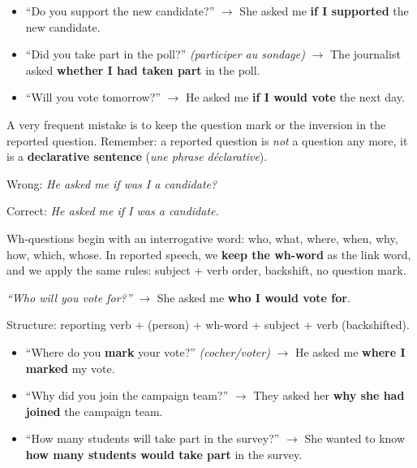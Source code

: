 \documentclass[11pt]{article}
\newcommand{\cle}[1]{{\popxbold\color{popdark}#1}}
\newcounter{popsec}
\newcounter{popsub}
\newcommand{\courssub}[1]{%
  \stepcounter{popsub}%
  \par\vspace{9pt}\noindent{\popxbold\fontsize{11.5}{13}\selectfont\color{popink}{\color{poporange}\thepopsec.\thepopsub}\hspace{6pt}#1}\par\nopagebreak\vspace{4pt}
}
\begin{document}
\begin{exemplebox}
\begin{itemize}
\item ``Do you support the new candidate?'' $\rightarrow$ She asked me \textbf{if I supported} the new candidate.
\item ``Did you take part in the poll?'' \emph{(participer au sondage)} $\rightarrow$ The journalist asked \textbf{whether I had taken part} in the poll.
\item ``Will you vote tomorrow?'' $\rightarrow$ He asked me \textbf{if I would vote} the next day.
\end{itemize}
\end{exemplebox}

\begin{attention}
A very frequent mistake is to keep the question mark or the inversion in the reported question. Remember: a reported question is \emph{not} a question any more, it is a \textbf{declarative sentence} (\emph{une phrase déclarative}).\par
Wrong: \emph{He asked me if was I a candidate?}\par
Correct: \emph{He asked me if I was a candidate.}
\end{attention}

\courssub{Reporting wh-questions}

Wh-questions begin with an interrogative word: \cle{who}, \cle{what}, \cle{where}, \cle{when}, \cle{why}, \cle{how}, \cle{which}, \cle{whose}. In reported speech, we \textbf{keep the wh-word} as the link word, and we apply the same rules: subject + verb order, backshift, no question mark.

\begin{propriete}
\emph{``Who will you vote for?''} $\rightarrow$ She asked me \textbf{who I would vote for}.\par
Structure: reporting verb + (person) + wh-word + subject + verb (backshifted).
\end{propriete}

\begin{exemplebox}
\begin{itemize}
\item ``Where do you \textbf{mark} your vote?'' \emph{(cocher/voter)} $\rightarrow$ He asked me \textbf{where I marked} my vote.
\item ``Why did you join the campaign team?'' $\rightarrow$ They asked her \textbf{why she had joined} the campaign team.
\item ``How many students will take part in the survey?'' $\rightarrow$ She wanted to know \textbf{how many students would take part} in the survey.
\end{itemize}
\end{exemplebox}
\end{document}
